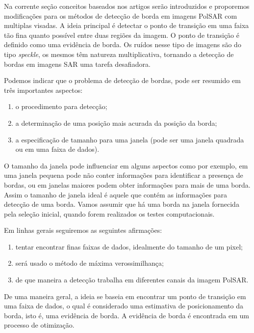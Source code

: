 Na corrente seção conceitos baseados nos artigos \citet{nhfc, gmbf} serão introduzidos e proporemos modificações para os métodos de detecção de borda em imagens PolSAR com multiplas visadas. A ideia principal é detectar o ponto de transição em uma faixa tão fina quanto possível entre duas regiões da imagem. O ponto de transição é definido como uma evidência de borda. Os ruídos nesse tipo de imagens são do tipo \textit{speckle}, os mesmos têm natureza multiplicativa, tornando a detecção de bordas em imagens SAR uma tarefa desafiadora.

Podemos indicar que o problema de detecção de bordas, pode ser resumido em três importantes aspectos:
\begin{enumerate}
	\item o procedimento para detecção;
	\item a determinação de uma posição mais acurada da posição da borda;
	\item a especificação de tamanho para uma janela (pode ser uma janela quadrada ou em uma faixa de dados). 
\end{enumerate}

O tamanho da janela pode influenciar em alguns aspectos como por exemplo, em uma janela pequena pode não conter informações para identificar a presença de bordas, ou em janelas maiores podem obter informações para mais de uma borda. Assim o tamanho de janela ideal é aquele que contém as informações para detecção de uma borda. Vamos assumir que há uma borda na janela fornecida pela seleção inicial, quando forem realizados os testes computacionais.

Em linhas gerais seguiremos as seguintes afirmações: 
\begin{enumerate}
	\item tentar encontrar finas faixas de dados, idealmente do tamanho de um pixel;
	\item será usado o método de máxima verossimilhança;
	\item de que maneira a detecção trabalha em diferentes canais da imagem PolSAR. 
\end{enumerate}

De uma maneira geral, a ideia se baseia em encontrar um ponto de transição em uma faixa de dados, o qual é considerado uma estimativa de posicionamento da borda, isto é, uma evidência de borda. A evidência de borda é encontrada em um processo de otimização. 

